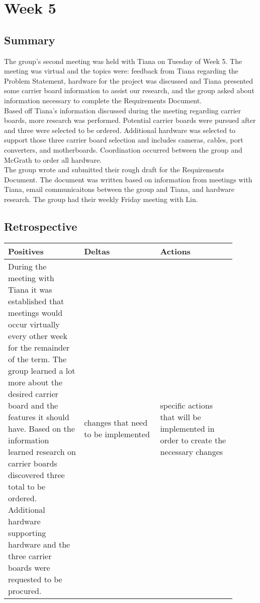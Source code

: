 \documentclass[letterpaper,10pt,serif,draftclsnofoot,onecolumn,compsoc,titlepage]{IEEEtran}
\begin{document}
\section{Week 5}

\subsection{Summary}

The group's second meeting was held with Tiana on Tuesday of Week 5. The meeting was 
virtual and the topics were: feedback from Tiana regarding the Problem Statement, 
hardware for the project was discussed and Tiana presented some carrier board information 
to assist our research, and the group asked about information necessary to complete 
the Requirements Document. \\

Based off Tiana's information discussed during the meeting regarding carrier boards,
more research was performed. Potential carrier boards were pursued after and three 
were selected to be ordered. Additional hardware was selected to support those three 
carrier board selection and includes cameras, cables, port converters, and 
motherboards. Coordination occurred between the group and McGrath to order all 
hardware. \\

The group wrote and submitted their rough draft for the Requirements Document. The 
document was written based on information from meetings with Tiana, email 
communicaitons between the group and Tiana, and hardware research.  The group had 
their weekly Friday meeting with Lin. \\

\subsection{Retrospective}

\begin{tabular}{|p{0.3\linewidth}|p{0.3\linewidth}|p{0.3\linewidth}|}
   \hline
   \textbf{Positives} & \textbf{Deltas} & \textbf{Actions}\\ 
   \hline
   During the meeting with Tiana it was established that meetings would occur virtually 
   every other week for the remainder of the term. The group learned a lot more about 
   the desired carrier board and the features it should have. Based on the information 
   learned research on carrier boards discovered three total to be ordered. Additional 
   hardware supporting hardware and the three carrier boards were requested to be 
   procured.  
   & 
   changes that need to be implemented 
   & 
   specific actions that will be implemented in order to create the necessary 
   changes \\
   \hline
\end{tabular}
\end{document}
